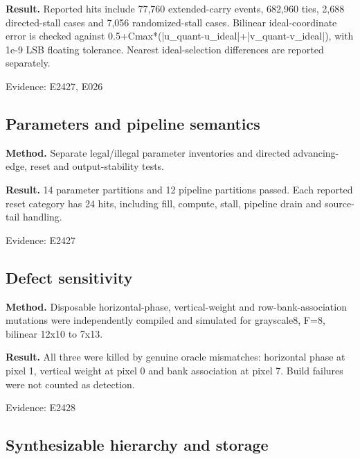 \documentclass[11pt,a4paper]{article}
\begin{document}
\textbf{Result.} Reported hits include 77,\allowbreak{}760 extended-carry events,\allowbreak{} 682,\allowbreak{}960 ties,\allowbreak{} 2,\allowbreak{}688 directed-stall cases and 7,\allowbreak{}056 randomized-stall cases. Bilinear ideal-coordinate error is checked against 0.5+\allowbreak{}Cmax*\allowbreak{}(\allowbreak{}|u\_\allowbreak{}quant-u\_\allowbreak{}ideal|+\allowbreak{}|v\_\allowbreak{}quant-v\_\allowbreak{}ideal|)\allowbreak{},\allowbreak{} with 1e-9 LSB floating tolerance. Nearest ideal-selection differences are reported separately.

{\small Evidence: E2427,\allowbreak{} E026}

\subsection{Parameters and pipeline semantics}

\textbf{Method.} Separate legal/\allowbreak{}illegal parameter inventories and directed advancing-edge,\allowbreak{} reset and output-stability tests.

\textbf{Result.} 14 parameter partitions and 12 pipeline partitions passed. Each reported reset category has 24 hits,\allowbreak{} including fill,\allowbreak{} compute,\allowbreak{} stall,\allowbreak{} pipeline drain and source-tail handling.

{\small Evidence: E2427}

\subsection{Defect sensitivity}

\textbf{Method.} Disposable horizontal-phase,\allowbreak{} vertical-weight and row-bank-association mutations were independently compiled and simulated for grayscale8,\allowbreak{} F=\allowbreak{}8,\allowbreak{} bilinear 12x10 to 7x13.

\textbf{Result.} All three were killed by genuine oracle mismatches: horizontal phase at pixel 1,\allowbreak{} vertical weight at pixel 0 and bank association at pixel 7. Build failures were not counted as detection.

{\small Evidence: E2428}

\subsection{Synthesizable hierarchy and storage}
\end{document}
